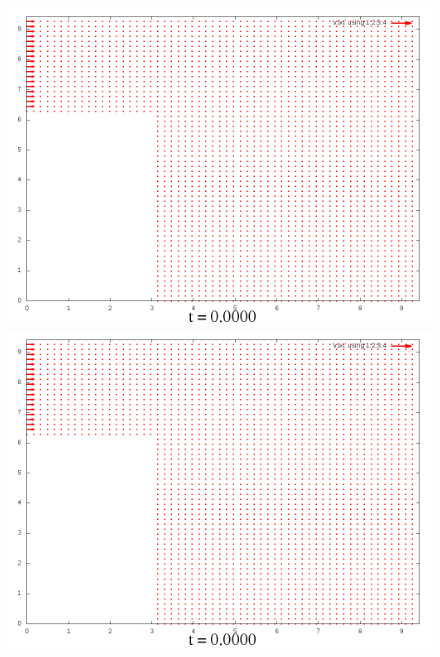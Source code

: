 \documentclass[a4paper, 12pt]{article}
\begin{document}
\begin{figure}[h]
	\begin{minipage}[h]{0.4\linewidth}
		\includegraphics[width=1\linewidth]{./img/01_1_1/V/0}
	\end{minipage}
	\hfill
	\begin{minipage}[h]{0.4\linewidth}
		\includegraphics[width=1\linewidth]{./img/01_1_01/V/0}
	\end{minipage}
\end{figure}
\end{document}
